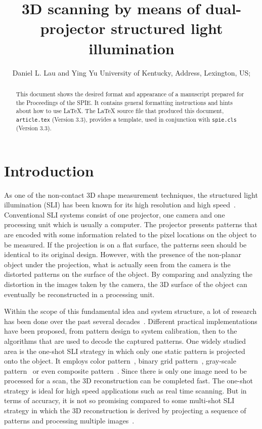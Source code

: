 \documentclass[]{spie}  %
\title{3D scanning by means of dual-projector structured light illumination}
\author{Daniel L. Lau\supit{a} and Ying Yu\supit{a}
\skiplinehalf
\supit{a}University of Kentucky, Address, Lexington, US; \\
}
\begin{document}
 
  \maketitle 

\begin{abstract}
This document shows the desired format and appearance of a manuscript prepared for the Proceedings of the SPIE.  It contains general formatting instructions and hints about how to use LaTeX.  The LaTeX source file that produced this document, {\tt article.tex} (Version 3.3), provides a template, used in conjunction with {\tt spie.cls} (Version 3.3).  
\end{abstract}



\section{Introduction}
\label{sec:intro}  %
As one of the non-contact 3D shape measurement techniques, the structured light illumination (SLI) has been known for its high resolution and high speed~\cite{chen00}. Conventional SLI systems consist of one projector, one camera and one processing unit which is usually a computer. The projector presents patterns that are encoded with some information related to the pixel locations on the object to be measured. If the projection is on a flat surface, the patterns seen should be identical to its original design. However, with the presence of the non-planar object under the projection, what is actually seen from the camera is the distorted patterns on the surface of the object. By comparing and analyzing the distortion in the images taken by the camera, the 3D surface of the object can eventually be reconstructed in a processing unit.

Within the scope of this fundamental idea and system structure, a lot of research has been done over the past several decades~\cite{geng11}. Different practical implementations have been proposed, from pattern design to system calibration, then to the algorithms that are used to decode the captured patterns. One widely studied area is the one-shot SLI strategy in which only one static pattern is projected onto the object. It employs color pattern~\cite{wust91}, binary grid pattern~\cite{grin92}, gray-scale pattern~\cite{durd98} or even composite pattern~\cite{guan08}. Since there is only one image need to be processed for a scan, the 3D reconstruction can be completed fast. The one-shot strategy is ideal for high speed applications such as real time scanning. But in terms of accuracy, it is not so promising compared to some multi-shot SLI strategy in which the 3D reconstruction is derived by projecting a sequence of patterns and processing multiple images~\cite{blai03}.
\end{document}
